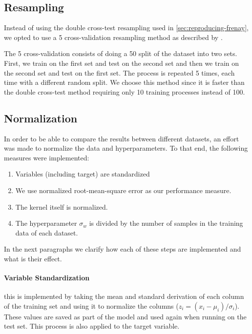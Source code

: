 \subsection{Resampling}

Instead of using the double cross-test resampling used in \cref{sec:reproducing-frenay},
we opted to use a 5 cross-validation resampling method as described by \textcite{dietterichApproximateStatisticalTests1998}.

The 5 cross-validation
consists of doing a 50 split of the dataset into two sets. First, we train on the first set and test on the second set
and then we train on the second set and test on the first set. The process is repeated 5 times, each time
with a different random split. We choose this method since it is faster than the double cross-test method
requiring only 10 training processes instead of 100.


\subsection{Normalization}

In order to be able to compare the results between different datasets, an effort
was made to normalize the data and hyperparameters. To that end, the
following measures were implemented:

\begin{enumerate}
    \item Variables (including target) are standardized
    \item We use normalized root-mean-square error as our performance
        measure.
    \item The kernel itself is normalized.
    \item The hyperparameter $\sigma_w$ is divided by the number of samples in
        the training data of each dataset.
\end{enumerate}

In the next paragraphs we clarify how each of these steps are implemented and
what is their effect.

\paragraph{Variable Standardization} this is implemented by taking the mean and
standard derivation of each column of the training set and using it to
normalize the columns ($z_i = (x_i - \mu_i)/\sigma_i$). These values are saved as
part of the model and used again when running on the test set. This process
is also applied to the target variable.

